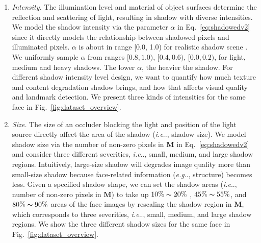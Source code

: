 \documentclass[10pt,twocolumn,letterpaper]{article}
\makeatletter
\newcommand{\figref}[1]{Fig.~\ref{#1}}
\newcommand{\reqref}[1]{Eq.~\eqref{#1}}
\DeclareRobustCommand\onedot{\futurelet\@let@token\@onedot}
\def\@onedot{\ifx\@let@token.\else.\null\fi\xspace}
\def\eg{\emph{e.g}\onedot} \def\Eg{\emph{E.g}\onedot}
\def\ie{\emph{i.e}\onedot} \def\Ie{\emph{I.e}\onedot}
\makeatother
\begin{document}
\begin{enumerate}[itemsep = 0 pt, parsep = 0pt, topsep =0pt,fullwidth,itemindent=1em,label=\roman*.]

\item{\textit{Intensity.}} 
%
The illumination level and material of object surfaces determine the reflection and scattering of light, resulting in shadow with diverse intensities.
We model the shadow intensity via the parameter $\alpha$ in \reqref{eq:shadowedv2} since it directly models the relationship between shadowed pixels and illuminated pixels. $\alpha$ is about in range [0.0, 1.0) for realistic shadow scene \cite{inoue2020learning}. We uniformly sample $\alpha$ from ranges $[0.8,1.0)$, $[0.4,0.6)$,  $[0.0,0.2)$, for light, medium and heavy shadows. The lower $\alpha$, the heavier the shadow. For different shadow intensity level design, we want to quantify how much texture and content degradation shadow brings, and how that affects visual quality and landmark detection.
%
We present three kinds of intensities for the same face in \figref{fig:dataset_overview}.



\item{\textit{Size.}} 
%
The size of an occluder blocking the light and position of the light source directly affect the area of the shadow (\ie, shadow size). We model shadow size via the number of non-zero pixels in $\mathbf{M}$ in \reqref{eq:shadowedv2} and consider three different severities, \ie, small, medium, and large shadow regions. Intuitively, large-size shadow will degrades image quality more than small-size shadow because face-related information (\eg, structure) becomes less. 
%
Given a specified shadow shape, we can set the shadow areas (\ie, number of non-zero pixels in $\mathbf{M}$) to take up $10\%\thicksim20\%$ , $45\%\thicksim55\%$, and $80\%\thicksim90\%$ areas of the face images by rescaling the shadow region in $\mathbf{M}$, which corresponds to three severities, \ie, small, medium, and large shadow regions.
%
We show the three different shadow sizes for the same face in \figref{fig:dataset_overview}. 
%


\end{enumerate}
\end{document}
